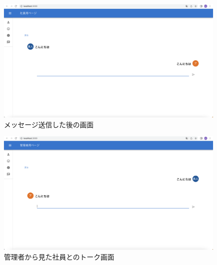                 \begin{figure}[!h]
                  \begin{center}
                    \includegraphics[scale=0.3, clip]{./img/chat9.png}
                    \caption{メッセージ送信した後の画面}
                    \label{fig:図の名前}
                  \end{center}
                  \end{figure}

                  \begin{figure}[!h]
                    \begin{center}
                      \includegraphics[scale=0.3, clip]{./img/chat10.png}
                      \caption{管理者から見た社員とのトーク画面}
                      \label{fig:図の名前}
                    \end{center}
                    \end{figure}